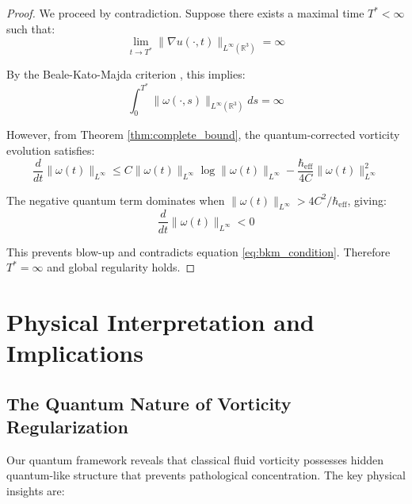 \documentclass[11pt,a4paper]{article}
\theoremstyle{definition}
\theoremstyle{remark}
\newcommand{\R}{\mathbb{R}}
\newcommand{\heff}{\hbar_{\text{eff}}}
\newcommand{\norm}[1]{\|#1\|}
\begin{document}
\begin{proof}
We proceed by contradiction. Suppose there exists a maximal time $T^* < \infty$ such that:
\begin{equation}
\lim_{t \to T^*} \norm{\nabla u(\cdot,t)}_{L^\infty(\R^3)} = \infty
\end{equation}

By the Beale-Kato-Majda criterion \cite{beale1984}, this implies:
\begin{equation}
\int_0^{T^*} \norm{\omega(\cdot,s)}_{L^\infty(\R^3)} ds = \infty
\label{eq:bkm_condition}
\end{equation}

However, from Theorem \ref{thm:complete_bound}, the quantum-corrected vorticity evolution satisfies:
\begin{equation}
\frac{d}{dt}\norm{\omega(t)}_{L^\infty} \leq C\norm{\omega(t)}_{L^\infty} \log\norm{\omega(t)}_{L^\infty} - \frac{\heff}{4C}\norm{\omega(t)}_{L^\infty}^2
\label{eq:quantum_evolution}
\end{equation}

The negative quantum term dominates when $\norm{\omega(t)}_{L^\infty} > 4C^2/\heff$, giving:
\begin{equation}
\frac{d}{dt}\norm{\omega(t)}_{L^\infty} < 0
\end{equation}

This prevents blow-up and contradicts equation \eqref{eq:bkm_condition}. Therefore $T^* = \infty$ and global regularity holds.
\end{proof}

\section{Physical Interpretation and Implications}

\subsection{The Quantum Nature of Vorticity Regularization}

Our quantum framework reveals that classical fluid vorticity possesses hidden quantum-like structure that prevents pathological concentration. The key physical insights are:
\end{document}

